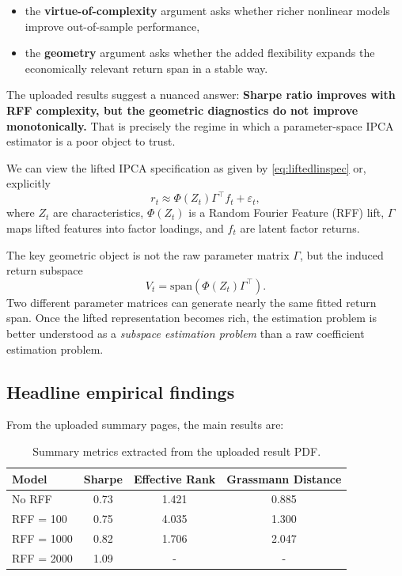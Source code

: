 \documentclass[twoside,11pt,letter]{article}
\begin{document}
\begin{itemize}
\item the \textbf{virtue-of-complexity} argument asks whether richer nonlinear models improve out-of-sample performance,
\item the \textbf{geometry} argument asks whether the added flexibility expands the economically relevant return span in a stable way.
\end{itemize}

The uploaded results suggest a nuanced answer: \textbf{Sharpe ratio improves with RFF complexity, but the geometric diagnostics do not improve monotonically.}
That is precisely the regime in which a parameter-space IPCA estimator is a poor object to trust.

We can view the lifted IPCA specification as given by \eqref{eq:liftedlinspec} or, explicitly
\begin{equation}
r_t \approx \Phi(Z_t)\Gamma^\top f_t + \varepsilon_t,
\end{equation}
where $Z_t$ are characteristics, $\Phi(Z_t)$ is a Random Fourier Feature (RFF) lift, $\Gamma$ maps lifted features into factor loadings,
and $f_t$ are latent factor returns.

The key geometric object is not the raw parameter matrix $\Gamma$, but the induced return subspace 
\begin{equation}
V_t = \mathrm{span}\!\left(\Phi(Z_t)\Gamma^\top\right).
\end{equation}
Two different parameter matrices can generate nearly the same fitted return span. Once the lifted representation becomes rich, the estimation problem is better understood as a \emph{subspace estimation problem} than a raw coefficient estimation problem.
	
\subsection{Headline empirical findings}

From the uploaded summary pages, the main results are:
\begin{table}[H]
\centering
\begin{tabular}{>{\raggedright\arraybackslash}p{2.1in}ccc}
\toprule
Model & Sharpe & Effective Rank & Grassmann Distance \\
\midrule
No RFF & 0.73 & 1.421 & 0.885 \\
RFF = 100 & 0.75 & 4.035 & 1.300 \\
RFF = 1000 & 0.82 & 1.706 & 2.047 \\
RFF = 2000 & 1.09 & - & - \\
\bottomrule
\end{tabular}
\caption{Summary metrics extracted from the uploaded result PDF.}
\end{table}
\end{document}
